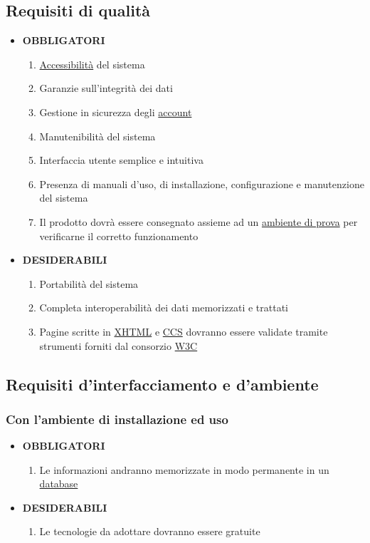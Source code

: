 \documentclass[11pt,a4paper]{article}
\begin{document}
\subsection{Requisiti di qualità}
\begin{itemize}
\item \textbf{OBBLIGATORI}
\begin{enumerate}
\item \underline{Accessibilità} del sistema
\item Garanzie sull'integrità dei dati
\item Gestione in sicurezza degli \underline{account}
\item Manutenibilità del sistema
\item Interfaccia utente semplice e intuitiva
\item Presenza di manuali d'uso, di installazione, configurazione e manutenzione del sistema
\item Il prodotto dovrà essere consegnato assieme ad un \underline{ambiente di prova} per verificarne il corretto funzionamento
\end{enumerate}
\item \textbf{DESIDERABILI}
\begin{enumerate}
\item Portabilità del sistema
\item Completa interoperabilità dei dati memorizzati e trattati
\item Pagine scritte in \underline{XHTML} e \underline{CCS} dovranno essere validate tramite strumenti forniti dal consorzio \underline{W3C}
\end{enumerate}
\end{itemize}
\subsection{Requisiti d'interfacciamento e d'ambiente}
\subsubsection{Con l’ambiente di installazione ed uso}
\begin{itemize}
\item \textbf{OBBLIGATORI}
\begin{enumerate}
\item Le informazioni andranno memorizzate in modo permanente in un \underline{database}
\end{enumerate}
\item \textbf{DESIDERABILI}
\begin{enumerate}
\item Le tecnologie da adottare dovranno essere gratuite
\end{enumerate}
\end{itemize}
\end{document}
